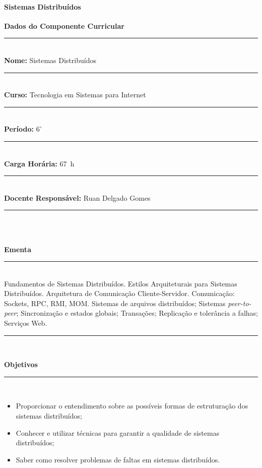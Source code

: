 \paragraph{Sistemas Distribu\'idos}

\begin{center}\textbf{Dados do Componente Curricular}\end{center}
\noindent\rule{16cm}{0.4pt}
\\
\textbf{Nome:} Sistemas Distribuídos\\ 
\noindent\rule{16cm}{0.4pt}\\
\textbf{Curso:} Tecnologia em Sistemas para Internet\\ 
\noindent\rule{16cm}{0.4pt}\\
\textbf{Período:} $6^{\circ}$\\ 
\noindent\rule{16cm}{0.4pt}\\
\textbf{Carga Horária:} 67~h\\ 
\noindent\rule{16cm}{0.4pt}\\
\textbf{Docente Responsável:} Ruan Delgado Gomes\\ 
\noindent\rule{16cm}{0.4pt}\\
\\
\begin{center}\textbf{Ementa}\end{center}
\noindent\rule{16cm}{0.4pt}
\\
Fundamentos de Sistemas Distribuídos. Estilos Arquiteturais para Sistemas Distribuídos. Arquitetura de Comunicação Cliente-Servidor. Comunicação: Sockets, RPC, RMI, MOM. Sistemas de arquivos distribuídos; Sistemas \textit{peer-to-peer}; Sincronização e estados globais; Transações; Replicação e tolerância a falhas; Serviços Web.\\ 
\noindent\rule{16cm}{0.4pt}\\
\begin{center}\textbf{Objetivos}\end{center}
\noindent\rule{16cm}{0.4pt}
\\
\begin{itemize}
\item Proporcionar o entendimento sobre as possíveis formas de estruturação dos sistemas distribuídos;
\item Conhecer e utilizar técnicas para garantir a qualidade de sistemas distribuídos;
\item Saber como resolver problemas de faltas em sistemas distribuídos.
\end{itemize} 
